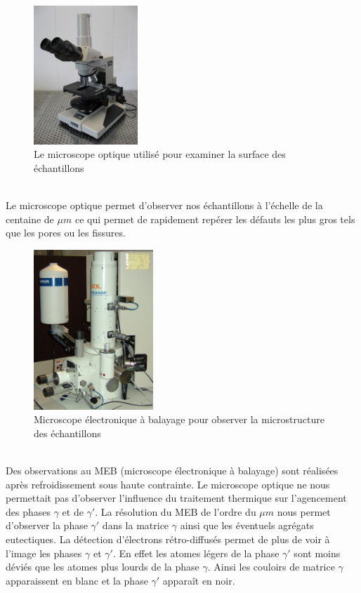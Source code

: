 \begin{figure}[htbp]
    \centering
    \includegraphics[width=0.35\textwidth]{images/optique.jpg}
    \caption{Le microscope optique utilisé pour examiner la surface des échantillons}
    \label{<label>}
\end{figure}
\\
Le microscope optique permet d'observer nos échantillons à l'échelle de la centaine de $\mu m$ ce qui permet de rapidement repérer les défauts les plus gros tels que les pores ou les fissures.
\\


\begin{figure}[htbp]
    \centering
    \includegraphics[width=0.4\textwidth]{images/JEOL_JSM-6340F.jpg}
    \caption{Microscope électronique à balayage pour observer la microstructure des échantillons}
    \label{<label>}
\end{figure}
\\
Des observations au MEB (microscope électronique à balayage) sont réalisées après refroidissement sous haute contrainte. Le microscope optique ne nous permettait pas d'observer l'influence du traitement thermique sur l'agencement des phases $\gamma$ et de $\gamma'$. La résolution du MEB de l'ordre du $\mu m$ nous permet d'observer la phase $\gamma'$ dans la matrice $\gamma$ ainsi que les éventuels agrégats eutectiques. La détection d'électrons rétro-diffusés permet de plus de voir à l'image les phases $\gamma$ et $\gamma'$. En effet les atomes légers de la phase $\gamma'$ sont moins déviés que les atomes plus lourds de la phase $\gamma$. Ainsi les couloirs de matrice $\gamma$ apparaissent en blanc et la phase $\gamma'$ apparaît en noir.
\newpage

